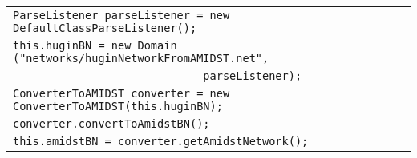 \begin{table}[H]
\begin{tabular}{l} \hline

        \texttt{ParseListener parseListener = new DefaultClassParseListener();}\\    
        \texttt{this.huginBN = new Domain ("networks/huginNetworkFromAMIDST.net", }\\
        \texttt{~~~~~~~~~~~~~~~~~~~~~~~~~~~~~parseListener);}\\
        \texttt{ConverterToAMIDST converter = new ConverterToAMIDST(this.huginBN);}\\ 
        \texttt{converter.convertToAmidstBN();}\\
        \texttt{this.amidstBN = converter.getAmidstNetwork();}\\ \hline 

\end{tabular}
\end{table} 



        
        
        
        
        
